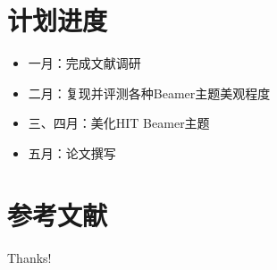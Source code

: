 \documentclass{beamer}
\begin{document}
\section{计划进度}
\begin{frame}
    \begin{itemize}
        \item 一月：完成文献调研
        \item 二月：复现并评测各种Beamer主题美观程度
        \item 三、四月：美化HIT Beamer主题
        \item 五月：论文撰写
    \end{itemize}
    \nocite{*}
\end{frame}


\section{参考文献}

\begin{frame}[allowframebreaks]
    \tiny
    
\end{frame}

\begin{frame}
    \begin{center}
        {\Huge\calligra Thanks!}
    \end{center}
\end{frame}
\end{document}
